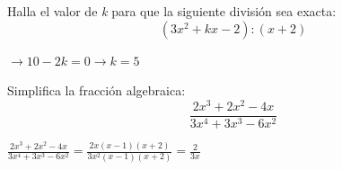 \documentclass[addpoints,spanish, 12pt,a4paper]{exam}
\begin{document}
\begin{questions}




\addpoints


\question[1] Halla el valor de \emph{k} para que la siguiente división sea exacta: $$(3x^2+kx-2):(x+2)$$
\begin{solution} $\to 10-2k=0 \to k=5 $ \end{solution}



\addpoints


\question[2] Simplifica la fracción algebraica: $$\frac{2 x^{3} + 2 x^{2} - 4 x}{3 x^{4} + 3 x^{3} - 6 x^{2}}$$
\begin{solution} $\frac{2 x^{3} + 2 x^{2} - 4 x}{3 x^{4} + 3 x^{3} - 6 x^{2}}=\frac{2 x \left(x - 1\right) \left(x + 2\right)}{3 x^{2} \left(x - 1\right) \left(x + 2\right)}=\frac{2}{3 x}$  \end{solution}


\end{questions}
\end{document}
